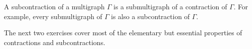 A subcontraction of a multigraph $\Gamma$ is a submultigraph of a contraction of $\Gamma$. For example, every submultigraph of $\Gamma$ is also a subcontraction of $\Gamma$.

The next two exercises cover most of the elementary but essential properties of contractions and subcontractions.
